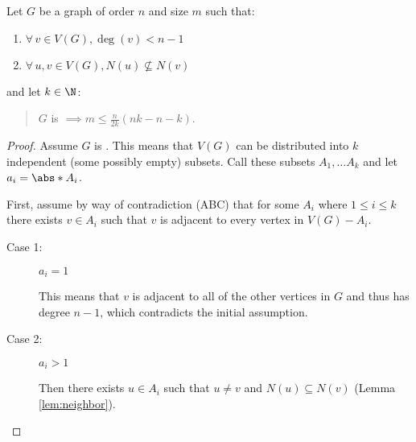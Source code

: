 \begin{lemma}
  \label{lem:tighter}
  Let \(G\) be a graph of order \(n\) and size \(m\) such that:
  \begin{enumerate}
  \item \(\forall\,v\in V(G),\deg(v)<n-1\)
  \item \(\forall\,u,v\in V(G),N(u)\not\subseteq N(v)\)
  \end{enumerate}
  and let \(k\in\N\):
  \begin{quote}
    \(G\) is  \(\displaystyle\implies m\le\frac{n}{2k}(nk-n-k)\).
  \end{quote}
\end{lemma}

\begin{proof}
  Assume \(G\) is .  This means that \(V(G)\) can be distributed into \(k\) independent (some possibly empty)
  subsets.  Call these subsets \(A_1,\ldots A_k\) and let \(a_i=\abs*{A_i}\).

  First, assume by way of contradiction (ABC) that for some \(A_i\) where \(1\le i\le k\) there exists \(v\in A_i\) such that
  \(v\) is adjacent to every vertex in \(V(G)-A_i\).

  \begin{description}
  \item[Case 1:] \(a_i=1\)

    This means that \(v\) is adjacent to all of the other vertices in \(G\) and thus has degree \(n-1\), which contradicts
    the initial assumption.

  \item[Case 2:] \(a_i>1\)

    Then there exists \(u\in A_i\) such that \(u\ne v\) and \(N(u)\subseteq N(v)\) (Lemma \ref{lem:neighbor}).
  \end{description}


\end{proof}
